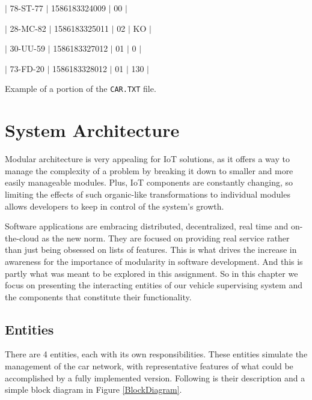 \documentclass[12pt]{article}
\begin{document}
$|$ 78-ST-77 $|$ 1586183324009 $|$ 00 $|$

$|$ 28-MC-82 $|$ 1586183325011 $|$ 02 $|$ KO $|$

$|$ 30-UU-59 $|$ 1586183327012 $|$ 01 $|$ 0 $|$

$|$ 73-FD-20 $|$ 1586183328012 $|$ 01 $|$ 130 $|$

Example of a portion of the \texttt{CAR.TXT} file.

\newpage 
\section{System Architecture} %

Modular architecture is very appealing for IoT solutions, as it offers a way to manage the complexity of a problem by breaking it down to smaller and more 
easily manageable modules.
Plus, IoT components are constantly changing, so limiting the effects of such organic-like transformations to individual modules allows developers to keep in 
control of the system's growth.

Software applications are embracing distributed, decentralized, real time and on-the-cloud as the new norm. 
They are focused on providing real service rather than just being obsessed on lists of features.
This is what drives the increase in awareness for the importance of modularity in software development.
And this is partly what was meant to be explored in this assignment.
So in this chapter we focus on presenting the interacting entities of our vehicle supervising system and the components that constitute their functionality.

\subsection{Entities} %

There are 4 entities, each with its own responsibilities.
These entities simulate the management of the car network, with representative features of what could be accomplished by a fully implemented version.
Following is their description and a simple block diagram in Figure \ref{BlockDiagram}.
\end{document}
